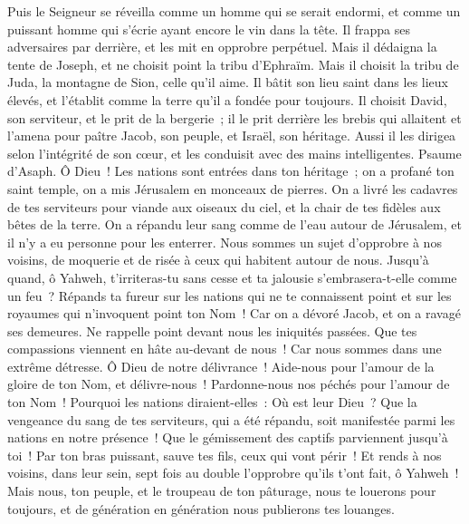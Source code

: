 \begin{multicols}{2}
Puis le Seigneur se réveilla comme un homme qui se serait endormi, et comme un puissant homme qui s'écrie ayant encore le vin dans la tête.
Il frappa ses adversaires par derrière, et les mit en opprobre perpétuel.
Mais il dédaigna la tente de Joseph, et ne choisit point la tribu d'Ephraïm.
Mais il choisit la tribu de Juda, la montagne de Sion, celle qu'il aime.
Il bâtit son lieu saint dans les lieux élevés, et l'établit comme la terre qu'il a fondée pour toujours.
Il choisit David, son serviteur, et le prit de la bergerie~;
il le prit derrière les brebis qui allaitent et l'amena pour paître Jacob, son peuple, et Israël, son héritage.
Aussi il les dirigea selon l'intégrité de son cœur, et les conduisit avec des mains intelligentes.
\VerseOne{}Psaume d'Asaph. Ô Dieu~! Les nations sont entrées dans ton héritage~; on a profané ton saint temple, on a mis Jérusalem en monceaux de pierres.
On a livré les cadavres de tes serviteurs pour viande aux oiseaux du ciel, et la chair de tes fidèles aux bêtes de la terre.
On a répandu leur sang comme de l'eau autour de Jérusalem, et il n'y a eu personne pour les enterrer.
Nous sommes un sujet d'opprobre à nos voisins, de moquerie et de risée à ceux qui habitent autour de nous.
Jusqu'à quand, ô Yahweh, t'irriteras-tu sans cesse et ta jalousie s'embrasera-t-elle comme un feu~?
Répands ta fureur sur les nations qui ne te connaissent point et sur les royaumes qui n'invoquent point ton Nom~!
Car on a dévoré Jacob, et on a ravagé ses demeures.
Ne rappelle point devant nous les iniquités passées. Que tes compassions viennent en hâte au-devant de nous~! Car nous sommes dans une extrême détresse.
Ô Dieu de notre délivrance~! Aide-nous pour l'amour de la gloire de ton Nom, et délivre-nous~! Pardonne-nous nos péchés pour l'amour de ton Nom~!
Pourquoi les nations diraient-elles~: Où est leur Dieu~? Que la vengeance du sang de tes serviteurs, qui a été répandu, soit manifestée parmi les nations en notre présence~!
Que le gémissement des captifs parviennent jusqu'à toi~! Par ton bras puissant, sauve tes fils, ceux qui vont périr~!
Et rends à nos voisins, dans leur sein, sept fois au double l'opprobre qu'ils t'ont fait, ô Yahweh~!
Mais nous, ton peuple, et le troupeau de ton pâturage, nous te louerons pour toujours, et de génération en génération nous publierons tes louanges.

\end{multicols}
